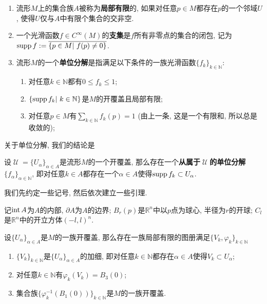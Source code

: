 \begin{defn}
    \begin{enumerate}[(1)]
        \item 流形$M$上的集合族$A$被称为\textbf{局部有限}的, 如果对任意$p\in M$都存在$p$的一个邻域$U$, 使得$U$仅与$A$中有限个集合的交非空.
        \item 一个光滑函数$f\in C^\infty(M)$的\textbf{支集}是$f$所有非零点的集合的闭包, 记为$\supp{f}:=\overline{\{p\in M|\ f(p)\not=0\}}$.
        \item 流形$M$的一个\textbf{单位分解}是指满足以下条件的一族光滑函数$\{f_k\}_{k\in\mathbb{N}}$:
        \begin{enumerate}
            \item 对任意$k\in\mathbb{N}$都有$0\leq f_k\leq 1$;
            \item $\{\supp{f_k}|\ k\in\mathbb{N}\}$是$M$的开覆盖且局部有限;
            \item 对任意$p\in M$有$\displaystyle\sum_{k\in\mathbb{N}}f_k(p)=1$ (由上一条, 这是一个有限和, 所以总是收敛的);
        \end{enumerate}
    \end{enumerate}
\end{defn}

关于单位分解, 我们的结论是
\begin{thm}[单位分解定理]\label{partition of unity}
    设$\mscrU=\{U_\alpha\}_{\alpha\in A}$是流形$M$的一个开覆盖, 那么存在一个\textbf{从属于$\mscrU$的单位分解}$\{f_\alpha\}_{\alpha\in\mathbb{N}}$, 即对任意$k\in A$都存在一个$\alpha\in A$使得$\operatorname{supp}{f_k}\subset U_\alpha$.
\end{thm}

我们先约定一些记号, 然后依次建立一些引理.
\begin{sym}
    记$\operatorname{int}{A}$为$A$的内部, $\partial{A}$为$A$的边界;
    $B_r(p)$是$\mathbb{R}^n$中以$p$点为球心, 半径为$r$的开球;
    $C_l$是$\mathbb{R}^n$中的开立方体$(-l,l)^n$.
\end{sym}

\begin{lem}[流形的仿紧性]\label{paracompact}
    设$\{U_\alpha\}_{\alpha\in A}$是$M$的一族开覆盖, 那么存在一族局部有限的图册满足$\{V_k,\varphi_k\}_{k\in\mathbb{N}}$
    \begin{enumerate}[{\rm (1)}]
        \item $\{V_k\}_{k\in\mathbb{N}}$是$\{U_\alpha\}_{\alpha\in A}$的加细, 即对任意$k\in\mathbb{N}$都存在$\alpha\in A$使得$V_k\subset U_\alpha$;
        \item 对任意$k\in\mathbb{N}$有$\varphi_k(V_k)=B_3(0)$;
        \item 集合族$\{\varphi^{-1}_k(B_1(0))\}_{k\in\mathbb{N}}$是$M$的一族开覆盖.
    \end{enumerate}
\end{lem}

